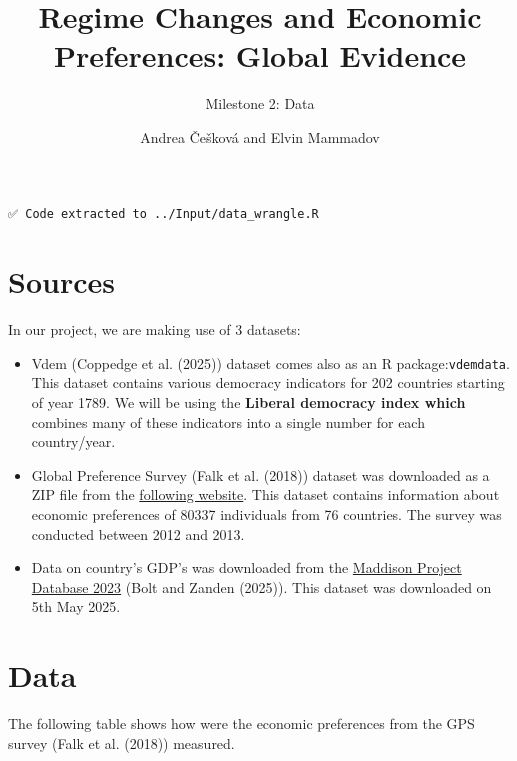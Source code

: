 \documentclass[
  letterpaper,
  DIV=11,
  numbers=noendperiod]{scrartcl}
\title{Regime Changes and Economic Preferences: Global Evidence}
\subtitle{Milestone 2: Data}
\author{Andrea Češková and Elvin Mammadov}
\date{}
\begin{document}
\maketitle
\ifdefined\Shaded\renewenvironment{Shaded}{\begin{tcolorbox}[enhanced, frame hidden, boxrule=0pt, sharp corners, interior hidden, borderline west={3pt}{0pt}{shadecolor}, breakable]}{\end{tcolorbox}}\fi

\begin{verbatim}
✅ Code extracted to ../Input/data_wrangle.R 
\end{verbatim}

\hypertarget{sources}{%
\section{Sources}\label{sources}}

In our project, we are making use of 3 datasets:

\begin{itemize}
\item
  Vdem (Coppedge et al. (2025)) dataset comes also as an R
  package:\texttt{vdemdata}. This dataset contains various democracy
  indicators for 202 countries starting of year 1789. We will be using
  the \textbf{Liberal democracy index which} combines many of these
  indicators into a single number for each country/year.
\item
  Global Preference Survey (Falk et al. (2018)) dataset was downloaded
  as a ZIP file from the \href{https://gps.iza.org/downloads}{following
  website}. This dataset contains information about economic preferences
  of 80337 individuals from 76 countries. The survey was conducted
  between 2012 and 2013.
\item
  Data on country's GDP's was downloaded from the
  \href{https://www.rug.nl/ggdc/historicaldevelopment/maddison/releases/maddison-project-database-2023}{Maddison
  Project Database 2023} (Bolt and Zanden (2025)). This dataset was
  downloaded on 5th May 2025.
\end{itemize}

\hypertarget{data}{%
\section{Data}\label{data}}

The following table shows how were the economic preferences from the GPS
survey (Falk et al. (2018)) measured.
\end{document}
